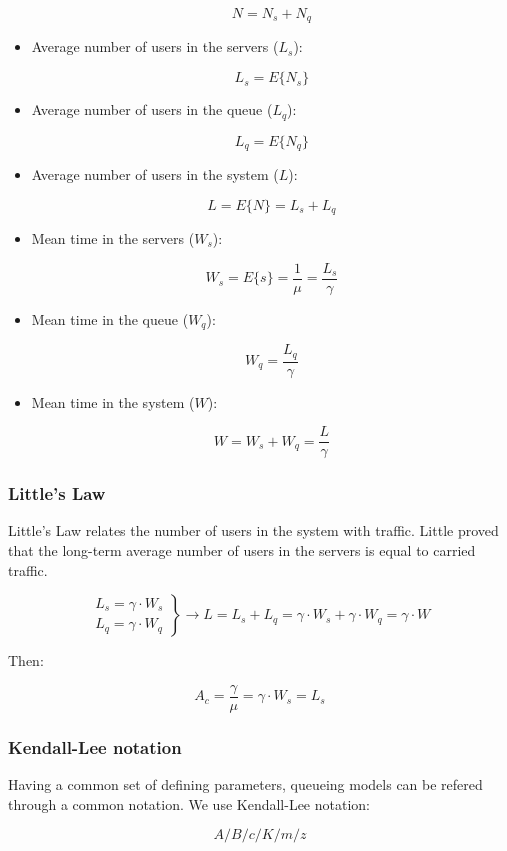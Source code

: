\documentclass[../main.tex]{subfiles}
\begin{document}
\begin{itemize}
{\begin{itemize}
{				$$ N = N_s + N_q $$
			}
		\end{itemize}
	}
	\item {
		Average number of users in the servers ($L_s$):

		$$ L_s = E\{N_s\} $$
	}
	\item {
		Average number of users in the queue ($L_q$):

		$$ L_q = E\{N_q\} $$
	}
	\item {
		Average number of users in the system ($L$):

		$$ L = E\{N\} = L_s + L_q $$
	}
	\item {
		Mean time in the servers ($W_s$):

		$$ W_s = E\{s\} = \frac{1}{\mu} = \frac{L_s}{\gamma} $$
	}
	\item {
		Mean time in the queue ($W_q$):

		$$ W_q = \frac {L_q} {\gamma} $$
	}
	\item {
		Mean time in the system ($W$):

		$$ W = W_s + W_q = \frac {L} {\gamma} $$
	}
\end{itemize}

\subsubsection{Little's Law}

Little's Law relates the number of users in the system with traffic.
Little proved that the long-term average number of users in the servers is equal to carried traffic.

$$
	\left.
	\begin{matrix}
		
		L_s = \gamma \cdot W_s \\
		L_q = \gamma \cdot W_q
	\end{matrix}
	\right\rbrace
	\rightarrow
	L = L_s + L_q = \gamma \cdot W_s + \gamma \cdot W_q = \gamma \cdot W
$$

Then:

$$
	A_c = \frac {\gamma} {\mu} = \gamma \cdot W_s = L_s
$$

\subsubsection{Kendall-Lee notation}

Having a common set of defining parameters, queueing models can be refered through a common notation. We use Kendall-Lee notation:

$$
	A / B / c / K / m / z
$$
\end{document}

